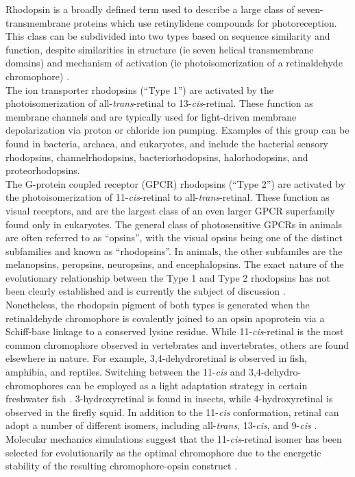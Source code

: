 \indent Rhodopsin is a broadly defined term used to describe a large class of seven-transmembrane proteins which use retinylidene compounds for photoreception. This class can be subdivided into two types based on sequence similarity and function, despite similarities in structure (ie seven helical transmembrane domains) and mechanism of activation (ie photoisomerization of a retinaldehyde chromophore) \cite{Spudich2000}.\\
\indent The ion transporter rhodopsins (\enquote{Type 1}) are activated by the photoisomerization of all-\textit{trans}-retinal to 13-\textit{cis}-retinal. These function as membrane channels and are typically used for light-driven membrane depolarization via proton or chloride ion pumping. Examples of this group can be found in bacteria, archaea, and eukaryotes, and include the bacterial sensory rhodopsins, channelrhodopsins, bacteriorhodopsins, halorhodopsins, and proteorhodopsins.\\
\indent The G-protein coupled receptor (GPCR) rhodopsins (\enquote{Type 2}) are activated by the photoisomerization of 11-\textit{cis}-retinal to all-\textit{trans}-retinal. These function as visual receptors, and are the largest class of an even larger GPCR superfamily found only in eukaryotes. The general class of photosensitive GPCRs in animals are often referred to as \enquote{opsins}, with the visual opsins being one of the distinct subfamilies and known as \enquote{rhodopsins}. In animals, the other subfamiles are the melanopsins, peropsins, neuropsins, and encephalopsins. The exact nature of the evolutionary relationship between the Type 1 and Type 2 rhodopsins has not been clearly established and is currently the subject of discussion \cite{Terakita2005,Shichida2009}.\\
\indent Nonetheless, the rhodopsin pigment of both types is generated when the retinaldehyde chromophore is covalently joined to an opsin apoprotein via a Schiff-base linkage to a conserved lysine residue. While 11-\textit{cis}-retinal is the most common chromophore observed in vertebrates and invertebrates, others are found elsewhere in nature. For example, 3,4-dehydroretinal is observed in fish, amphibia, and reptiles. Switching between the 11-\textit{cis} and 3,4-dehydro- chromophores can be employed as a light adaptation strategy in certain freshwater fish \cite{Shichida2009}. 3-hydroxyretinal is found in insects, while 4-hydroxyretinal is observed in the firefly squid. In addition to the 11-\textit{cis} conformation, retinal can adopt a number of different isomers, including all-\textit{trans}, 13-\textit{cis}, and 9-\textit{cis} \cite{Shichida2009}. Molecular mechanics simulations suggest that the 11-\textit{cis}-retinal isomer has been selected for evolutionarily as the optimal chromophore due to the energetic stability of the resulting chromophore-opsin construct \cite{Sekharan2011}.\\ 
